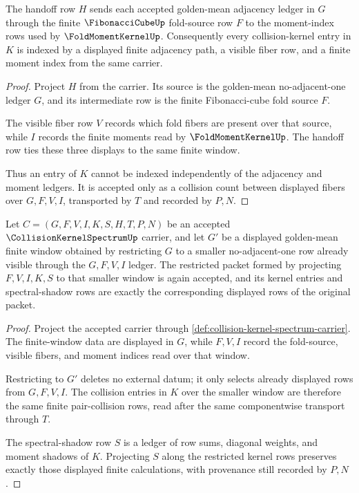\begin{theorem}
\label{thm:collision-kernel-spectrum-adjacency-moment-handoff}
The handoff row $H$ sends each accepted golden-mean adjacency ledger in $G$ through the finite $\FibonacciCubeUp$ fold-source row $F$ to the moment-index rows used by $\FoldMomentKernelUp$. Consequently every collision-kernel entry in $K$ is indexed by a displayed finite adjacency path, a visible fiber row, and a finite moment index from the same carrier.
\end{theorem}
\begin{proof}
Project $H$ from the carrier. Its source is the golden-mean no-adjacent-one ledger $G$, and its intermediate row is the finite Fibonacci-cube fold source $F$.

The visible fiber row $V$ records which fold fibers are present over that source, while $I$ records the finite moments read by $\FoldMomentKernelUp$. The handoff row ties these three displays to the same finite window.

Thus an entry of $K$ cannot be indexed independently of the adjacency and moment ledgers. It is accepted only as a collision count between displayed fibers over $G,F,V,I$, transported by $T$ and recorded by $P,N$.
\end{proof}

\begin{theorem}
\label{thm:collision-kernel-spectrum-window-restriction}
Let $C=(G,F,V,I,K,S,H,T,P,N)$ be an accepted $\CollisionKernelSpectrumUp$ carrier, and let $G'$ be a displayed golden-mean finite window obtained by restricting $G$ to a smaller no-adjacent-one row already visible through the $G,F,V,I$ ledger. The restricted packet formed by projecting $F,V,I,K,S$ to that smaller window is again accepted, and its kernel entries and spectral-shadow rows are exactly the corresponding displayed rows of the original packet.
\end{theorem}
\begin{proof}
Project the accepted carrier through \autoref{def:collision-kernel-spectrum-carrier}. The finite-window data are displayed in $G$, while $F,V,I$ record the fold-source, visible fibers, and moment indices read over that window.

Restricting to $G'$ deletes no external datum; it only selects already displayed rows from $G,F,V,I$. The collision entries in $K$ over the smaller window are therefore the same finite pair-collision rows, read after the same componentwise transport through $T$.

The spectral-shadow row $S$ is a ledger of row sums, diagonal weights, and moment shadows of $K$. Projecting $S$ along the restricted kernel rows preserves exactly those displayed finite calculations, with provenance still recorded by $P,N$.
\end{proof}


